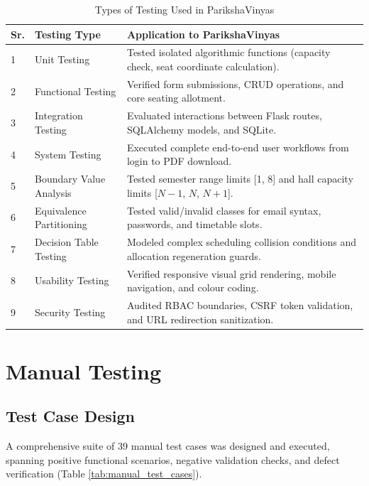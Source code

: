 \documentclass{InternshipReport}
\begin{document}
\begin{table}[H]
\centering
\small
\caption{Types of Testing Used in ParikshaVinyas}
\label{tab:testing_types}
\begin{tabular}{p{} p{} p{}}
\toprule
\textbf{Sr.} & \textbf{Testing Type} & \textbf{Application to ParikshaVinyas} \\
\midrule
1 & Unit Testing & Tested isolated algorithmic functions (capacity check, seat coordinate calculation). \\
2 & Functional Testing & Verified form submissions, CRUD operations, and core seating allotment. \\
3 & Integration Testing & Evaluated interactions between Flask routes, SQLAlchemy models, and SQLite. \\
4 & System Testing & Executed complete end-to-end user workflows from login to PDF download. \\
5 & Boundary Value Analysis & Tested semester range limits [1, 8] and hall capacity limits [$N-1$, $N$, $N+1$]. \\
6 & Equivalence Partitioning & Tested valid/invalid classes for email syntax, passwords, and timetable slots. \\
7 & Decision Table Testing & Modeled complex scheduling collision conditions and allocation regeneration guards. \\
8 & Usability Testing & Verified responsive visual grid rendering, mobile navigation, and colour coding. \\
9 & Security Testing & Audited RBAC boundaries, CSRF token validation, and URL redirection sanitization. \\
\bottomrule
\end{tabular}
\end{table}


\chapter{Manual Testing}

\section{Test Case Design}
A comprehensive suite of 39 manual test cases was designed and executed, spanning positive functional scenarios, negative validation checks, and defect verification (Table \ref{tab:manual_test_cases}).
\end{document}
